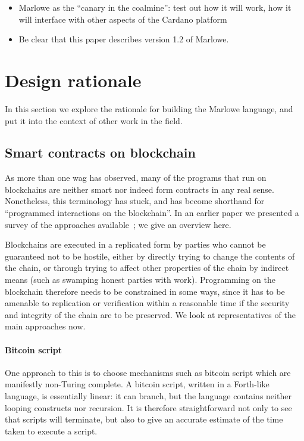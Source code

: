 \documentclass[
      acmsmall
    , screen
    , review=true
  ]{acmart}
\begin{document}
\begin{itemize}
\item
Marlowe as the ``canary in the coalmine'': test out how it will work, how it will interface with
other aspects of the Cardano platform
\item
Be clear that this paper describes version 1.2 of Marlowe.
\end{itemize}


\section{Design rationale}


\medskip
\noindent
In this section we explore the rationale for building the Marlowe language, and put it into the context of other work in the field.

\subsection{Smart contracts on blockchain}

As more than one wag has observed, many of the programs that run on blockchains are neither smart nor indeed form contracts in any real sense. Nonetheless, this terminology has stuck, and has become shorthand for ``programmed interactions on the blockchain''. In an earlier paper we presented a survey of the approaches available~\cite{cryptoeprint:2016:1156}; we give an overview here.

Blockchains are executed in a replicated form by parties who cannot be guaranteed not to be hostile, either by directly trying to change the contents of the chain, or through trying to affect other properties of the chain by indirect means (such as swamping honest parties with work). Programming on the blockchain therefore needs to be constrained in some ways, since it has to be amenable to replication or verification within a reasonable time if the security and integrity of the chain are to be preserved. We look at representatives of the main approaches now.

\paragraph{Bitcoin script}

One approach to this is to choose mechanisms such as bitcoin script which are manifestly non-Turing complete. A bitcoin script, written in a Forth-like language, is essentially linear: it can branch, but the language contains neither looping constructs nor recursion. It is therefore straightforward not only to see that scripts will terminate, but also to give an accurate estimate of the time taken to execute a script. 
\end{document}
